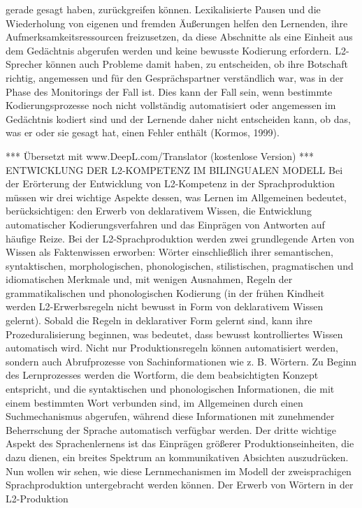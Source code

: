 \documentclass[
  letterpaper,
]{scrbook}
\begin{document}
gerade gesagt haben, zurückgreifen können. Lexikalisierte Pausen und die
Wiederholung von eigenen und fremden Äußerungen helfen den Lernenden,
ihre Aufmerksamkeitsressourcen freizusetzen, da diese Abschnitte als
eine Einheit aus dem Gedächtnis abgerufen werden und keine bewusste
Kodierung erfordern. L2-Sprecher können auch Probleme damit haben, zu
entscheiden, ob ihre Botschaft richtig, angemessen und für den
Gesprächspartner verständlich war, was in der Phase des Monitorings der
Fall ist. Dies kann der Fall sein, wenn bestimmte Kodierungsprozesse
noch nicht vollständig automatisiert oder angemessen im Gedächtnis
kodiert sind und der Lernende daher nicht entscheiden kann, ob das, was
er oder sie gesagt hat, einen Fehler enthält (Kormos, 1999).

*** Übersetzt mit www.DeepL.com/Translator (kostenlose Version) ***
ENTWICKLUNG DER L2-KOMPETENZ IM BILINGUALEN MODELL Bei der Erörterung
der Entwicklung von L2-Kompetenz in der Sprachproduktion müssen wir drei
wichtige Aspekte dessen, was Lernen im Allgemeinen bedeutet,
berücksichtigen: den Erwerb von deklarativem Wissen, die Entwicklung
automatischer Kodierungsverfahren und das Einprägen von Antworten auf
häufige Reize. Bei der L2-Sprachproduktion werden zwei grundlegende
Arten von Wissen als Faktenwissen erworben: Wörter einschließlich ihrer
semantischen, syntaktischen, morphologischen, phonologischen,
stilistischen, pragmatischen und idiomatischen Merkmale und, mit wenigen
Ausnahmen, Regeln der grammatikalischen und phonologischen Kodierung (in
der frühen Kindheit werden L2-Erwerbsregeln nicht bewusst in Form von
deklarativem Wissen gelernt). Sobald die Regeln in deklarativer Form
gelernt sind, kann ihre Prozeduralisierung beginnen, was bedeutet, dass
bewusst kontrolliertes Wissen automatisch wird. Nicht nur
Produktionsregeln können automatisiert werden, sondern auch
Abrufprozesse von Sachinformationen wie z. B. Wörtern. Zu Beginn des
Lernprozesses werden die Wortform, die dem beabsichtigten Konzept
entspricht, und die syntaktischen und phonologischen Informationen, die
mit einem bestimmten Wort verbunden sind, im Allgemeinen durch einen
Suchmechanismus abgerufen, während diese Informationen mit zunehmender
Beherrschung der Sprache automatisch verfügbar werden. Der dritte
wichtige Aspekt des Sprachenlernens ist das Einprägen größerer
Produktionseinheiten, die dazu dienen, ein breites Spektrum an
kommunikativen Absichten auszudrücken. Nun wollen wir sehen, wie diese
Lernmechanismen im Modell der zweisprachigen Sprachproduktion
untergebracht werden können. Der Erwerb von Wörtern in der L2-Produktion
\end{document}
